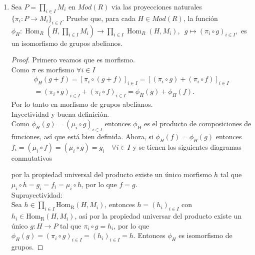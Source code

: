 \documentclass{article}
\begin{document}
\begin{enumerate}[label=\textbf{Ej \arabic*.}]
	

\item Sea $P=\displaystyle\prod_{i \in I}M_{i}$ en $Mod(R)$ via las proyecciones naturales \\$\{\pi_i\colon P\longrightarrow M_i\}_{i\in I}$. 
Pruebe que, para cada $H\in Mod(R)$, la función $\phi_H\colon \operatorname{Hom}_R(H,\displaystyle\prod_{i \in I}M_{i})
\longrightarrow \prod_{i \in I}\operatorname{Hom}_R(H,M_{i}),\,\,\,g\mapsto (\pi_i\circ g)_{i\in I},$ es un isomorfismo de grupos abelianos. 
\begin{proof}
Primero veamos que es morfismo.\\
Como $\pi$ es morfismo $\forall i\in I$
\begin{gather*}
\phi_H(g+f)=[\pi_i\circ (g+f)]_{i\in I}=[(\pi_i\circ g)+(\pi_i\circ f)]_{i\in I}\\
= (\pi_i\circ g)_{i\in I}+ (\pi_i\circ f)_{i\in I}=\phi_H(g)+\phi_H(f).
\end{gather*}
Por lo tanto en morfismo de grupos abelianos.\\

Inyectividad y buena definición.\\

Como $\phi_H(g)= (\mu_i\circ g)_{i\in I}$ entonces $\phi_H$ es el producto de composiciones de funciones, así que está bien definida. Ahora,
si $\phi_H(f)=\phi_H(g)$ entonces $ f_i=(\mu_i\circ f)=(\mu_i\circ g)=g_i\quad \forall i\in I $ y se tienen los siguientes diagramas conmutativos


por la propiedad universal del producto existe un único morfismo $h$ tal que $\mu_i\circ h=g_i=f_i=\mu_i\circ h$, por lo que $f=g$.\\

Suprayectividad:\\
Sea $h\in \displaystyle\prod_{i\in I} \operatorname{Hom_R}(H,M_i)$, entonces $h=(h_i)_{i\in I}$ con $h_i\in \operatorname{Hom_R}(H,M_i)$,
así por la propiedad universar del producto existe un único $g\colon H\longrightarrow P$ tal que $\pi_i\circ g=h_i$, por lo que 
$\phi_H(g)=(\pi_i\circ g)_{i\in I}=(h_i)_{i\in I}=h$. Entonces $\phi_H$ es isomorfismo de grupos.



\end{proof}
\end{enumerate}
\end{document}
